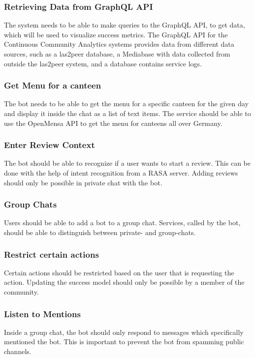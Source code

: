 \subsubsection{Retrieving Data from GraphQL API}
The system needs to be able to make queries to the GraphQL API, to get data, which will be used to visualize success metrics. The GraphQL API  for the Continuous Community Analytics systems provides data from different data sources, such as a las2peer database, a Mediabase with data collected from outside the las2peer system, and a database contains service logs.

\subsubsection{Get Menu for a canteen} The bot needs to be able to get the menu for a specific canteen for the given day and display it inside the chat as a list of text items. The service should be able to use the OpenMensa API \footnotemark to get the menu for canteens all over Germany.


\subsubsection{Enter Review Context} The bot should be able to recognize if a user wants to start a review. This can be done with the help of intent recognition from a RASA server. Adding reviews should only be possible in private chat with the bot.

\subsubsection{Group Chats} Users should be able to add a bot to a group chat. Services, called by the bot, should be able to distinguish between private- and group-chats.

\subsubsection{Restrict certain actions}
Certain actions should be restricted based on the user that is requesting the action. Updating the success model should only be possible by a member of the community.

\subsubsection{Listen to Mentions} Inside a group chat, the bot should only respond to messages which specifically mentioned the bot. This is important to prevent the bot from spamming public channels.

